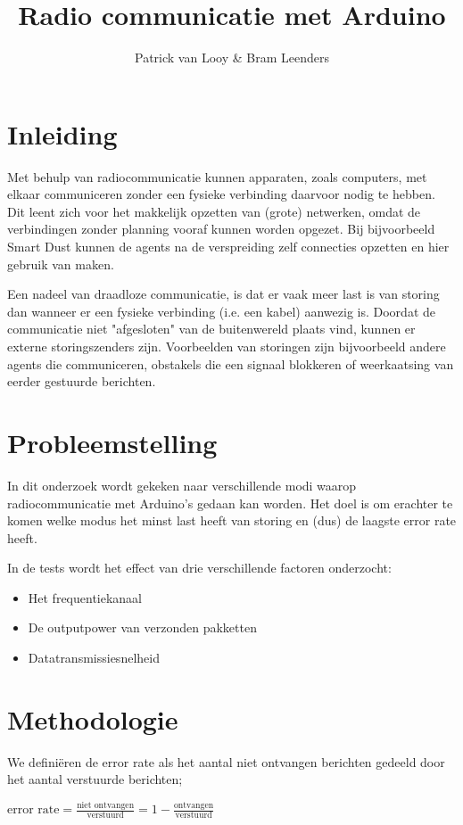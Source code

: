 \documentclass[a4paper,10pt]{article}
\title{Radio communicatie met Arduino}
\author{Patrick van Looy \& Bram Leenders}
\begin{document}
\maketitle

\section{Inleiding}
Met behulp van radiocommunicatie kunnen apparaten, zoals computers, met elkaar communiceren zonder een fysieke verbinding daarvoor nodig te hebben. Dit leent zich voor het makkelijk opzetten van (grote) netwerken, omdat de verbindingen zonder planning vooraf kunnen worden opgezet. Bij bijvoorbeeld Smart Dust kunnen de agents na de verspreiding zelf connecties opzetten en hier gebruik van maken.

Een nadeel van draadloze communicatie, is dat er vaak meer last is van storing dan wanneer er een fysieke verbinding (i.e. een kabel) aanwezig is. Doordat de communicatie niet "afgesloten" van de buitenwereld plaats vind, kunnen er externe storingszenders zijn. Voorbeelden van storingen zijn bijvoorbeeld andere agents die communiceren, obstakels die een signaal blokkeren of weerkaatsing van eerder gestuurde berichten.

\section{Probleemstelling}
In dit onderzoek wordt gekeken naar verschillende modi waarop radiocommunicatie met Arduino's gedaan kan worden. Het doel is om erachter te komen welke modus het minst last heeft van storing en (dus) de laagste error rate heeft.

In de tests wordt het effect van drie verschillende factoren onderzocht:
\begin{itemize}
	\item Het frequentiekanaal
	\item De outputpower van verzonden pakketten
	\item Datatransmissiesnelheid
\end{itemize}

\section{Methodologie}
We defini\"eren de error rate als het aantal niet ontvangen berichten gedeeld door het aantal verstuurde berichten;

\begin{math}
	\text{error rate} = \frac{\text{niet ontvangen}}{\text{verstuurd}} = 1 - \frac{\text{ontvangen}}{\text{verstuurd}} 
\end{math}
\end{document}
